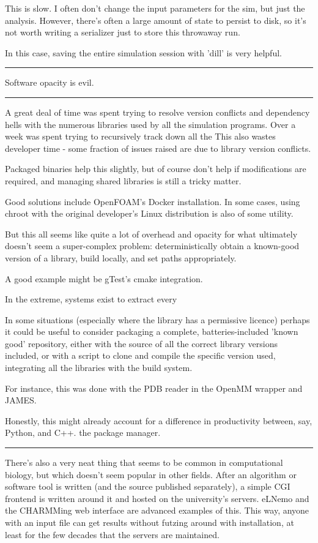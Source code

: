 \documentclass[paper.tex]{subfiles}
\begin{document}
This is slow. I often don't change the input parameters for the sim, but just the analysis. However, there's often a large amount of state to persist to disk, so it's not worth writing a serializer just to store this throwaway run.

In this case, saving the entire simulation session with 'dill' is very helpful.

\rule{\linewidth}{0.2pt}

Software opacity is evil.

\rule{\linewidth}{0.2pt}

A great deal of time was spent trying to resolve version conflicts and dependency hells with the numerous libraries used by all the simulation programs. Over a week was spent trying to recursively track down all the This also wastes developer time - some fraction of issues raised are due to library version conflicts. 

Packaged binaries help this slightly, but of course don't help if modifications are required, and managing shared libraries is still a tricky matter.

Good solutions include OpenFOAM's Docker installation. In some cases, using chroot with the original developer's Linux distribution is also of some utility.

But this all seems like quite a lot of overhead and opacity for what ultimately doesn't seem a super-complex problem: deterministically obtain a known-good version of a library, build locally, and set paths appropriately.

A good example might be gTest's cmake integration.

In the extreme, systems exist to extract every 

In some situations (especially where the library has a permissive licence) perhaps it could be useful to consider packaging a complete, batteries-included 'known good' repository, either with the source of all the correct library versions included, or with a script to clone and compile the specific version used, integrating all the libraries with the build system. 

For instance, this was done with the PDB reader in the OpenMM wrapper and JAMES.

Honestly, this might already account for a difference in productivity between, say, Python, and C++. the package manager.

\rule{\linewidth}{0.2pt}

There's also a very neat thing that seems to be common in computational biology, but which doesn't seem popular in other fields. After an algorithm or software tool is written (and the source published separately), a simple CGI frontend is written around it and hosted on the university's servers. eLNemo and the CHARMMing web interface are advanced examples of this. This way, anyone with an input file can get results without futzing around with installation, at least for the few decades that the servers are maintained.
\end{document}
